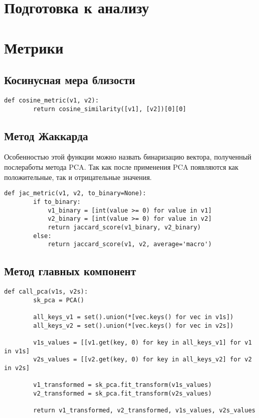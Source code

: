 \section{Подготовка к анализу}

\section{Метрики}

\subsection{Косинусная мера близости}

\begin{lstlisting}[label=cos-func, caption={Косинусная мера близости}]
    def cosine_metric(v1, v2):
        return cosine_similarity([v1], [v2])[0][0]
\end{lstlisting}

\subsection{Метод Жаккарда}

Особенностью этой функции можно назвать бинаризацию вектора, полученный послеработы метода PCA. 
Так как после применения PCA появляются как положительные, так и отрицательные значения.

\begin{lstlisting}[label=jac-list, caption={Метод Жаккарда}]
    def jac_metric(v1, v2, to_binary=None):
        if to_binary:
            v1_binary = [int(value >= 0) for value in v1]
            v2_binary = [int(value >= 0) for value in v2]
            return jaccard_score(v1_binary, v2_binary)
        else:
            return jaccard_score(v1, v2, average='macro')
\end{lstlisting}

\subsection{Метод главных компонент}

\begin{lstlisting}[label=pca-list, caption={Метод главных компонент}]
    def call_pca(v1s, v2s):
        sk_pca = PCA()

        all_keys_v1 = set().union(*[vec.keys() for vec in v1s])
        all_keys_v2 = set().union(*[vec.keys() for vec in v2s])

        v1s_values = [[v1.get(key, 0) for key in all_keys_v1] for v1 in v1s]
        v2s_values = [[v2.get(key, 0) for key in all_keys_v2] for v2 in v2s]

        v1_transformed = sk_pca.fit_transform(v1s_values)
        v2_transformed = sk_pca.fit_transform(v2s_values)

        return v1_transformed, v2_transformed, v1s_values, v2s_values
\end{lstlisting}

